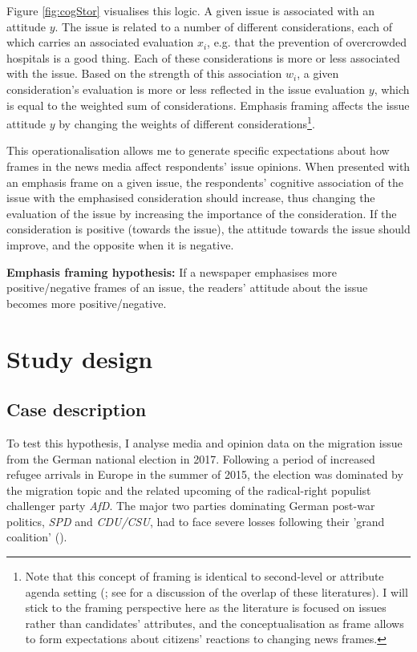 \documentclass{article}
\begin{document}
Figure \ref{fig:cogStor} visualises this logic. A given issue is associated with an attitude $y$. The issue is related to a number of different considerations, each of which carries an associated evaluation $x_i$, e.g. that the prevention of overcrowded hospitals is a good thing. Each of these considerations is more or less associated with the issue. Based on the strength of this association $w_i$, a given consideration's evaluation is more or less reflected in the issue evaluation $y$, which is equal to the weighted sum of considerations. Emphasis framing affects the issue attitude $y$ by changing the weights of different considerations\footnote{Note that this concept of framing is identical to second-level or attribute agenda setting (\cite{Lopezescobar2017, McCombs2000}; see \cite[174]{Mclaren2018} for a discussion of the overlap of these literatures). I will stick to the framing perspective here as the literature is focused on issues rather than candidates' attributes, and the conceptualisation as frame allows to form expectations about citizens' reactions to changing news frames.}.

This operationalisation allows me to generate specific expectations about how frames in the news media affect respondents' issue opinions. When presented with an emphasis frame on a given issue, the respondents' cognitive association of the issue with the emphasised consideration should increase, thus changing the evaluation of the issue by increasing the importance of the consideration. If the consideration is positive (towards the issue), the attitude towards the issue should improve, and the opposite when it is negative. \medskip

\textbf{Emphasis framing hypothesis:} If a newspaper emphasises more positive/negative frames of an issue, the readers' attitude about the issue becomes more positive/negative.




\section{Study design}

\subsection{Case description}

To test this hypothesis, I analyse media and opinion data on the migration issue from the German national election in 2017. Following a period of increased refugee arrivals in Europe in the summer of 2015, the election was dominated by the migration topic and the related upcoming of the radical-right populist challenger party \textit{AfD}. The major two parties dominating German post-war politics, \textit{SPD} and \textit{CDU/CSU}, had to face severe losses following their 'grand coalition' (\cite{Bieber2021, Wessels2021}).
\end{document}

